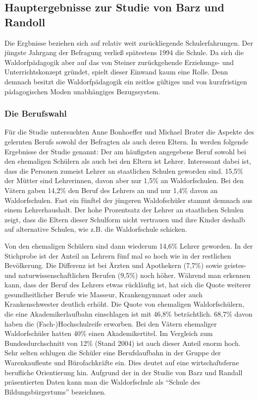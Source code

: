 \subsection{Hauptergebnisse zur Studie von Barz und Randoll} %
\label{sub:hauptergebnisse}


Die Ergbnisse beziehen sich auf relativ weit zurückliegende Schulerfahrungen. Der jüngste Jahrgang der Befragung verließ spätestens 1994 die Schule. Da sich die Waldorfpädagogik aber auf das von Steiner zurückgehende Erziehungs- und Unterrichtskonzept gründet, spielt dieser Einwand kaum eine Rolle. Denn demnach besitzt die Waldorfpädagogik ein zeitlos gültiges und von kurzfristigen pädagogischen Moden unabhängiges Bezugssystem. \citep[Vgl.][S. 16]{randoll07}

\subsubsection{Die Berufswahl}
\label{subsub:Berufswahl}

Für die Studie untersuchten Anne Bonhoeffer und Michael Brater die Aspekte des gelernten Berufs sowohl der Befragten als auch deren Eltern. In \citet[][S. 16f]{randoll07} werden folgende Ergebnisse der Studie genannt: Der am häufigsten angegebene Beruf sowohl bei den ehemaligen Schülern als auch bei den Eltern ist Lehrer. Interessant dabei ist, dass die Personen zumeist Lehrer an staatlichen Schulen geworden sind. 15,5\% der Mütter sind Lehrerinnen, davon aber nur 1,5\% an Waldorfschulen. Bei den Vätern gaben 14,2\% den Beruf des Lehrers an und nur 1,4\% davon an Waldorfschulen. Fast ein fünftel der jüngeren Waldofschüler stammt demnach aus einem Lehrerhaushalt. Der hohe Prozentsatz der Lehrer an staatlichen Schulen zeigt, dass die Eltern dieser Schulform nicht vertrauen und ihre Kinder deshalb auf alternative Schulen, wie z.B. die Waldorfschule schicken.

Von den ehemaligen Schülern sind dann wiederum 14,6\% Lehrer geworden. In der Stichprobe ist der Anteil an Lehrern fünf mal so hoch wie in der restlichen Bevölkerung. Die Differenz ist bei Ärzten und Apothekern (7,7\%) sowie geistes- und naturwissenschaftlichen Berufen (9,5\%) noch höher. Während man erkennen kann, dass der Beruf des Lehrers etwas rückläufig ist, hat sich die Quote weiterer gesundheitlicher Berufe wie Masseur, Krankengymnast oder auch Krankenschwester deutlich erhöht. Die Quote von ehemaligen Waldorfschülern, die eine Akademikerlaufbahn einschlagen ist mit 46,8\% beträchtlich. 68,7\% davon haben die (Fach-)Hochschulreife erworben. Bei den Vätern ehemaliger Waldorfschüler hatten 40\% einen Akademikertitel. Im Vergleich zum Bundesdurchschnitt von 12\% (Stand 2004) ist auch dieser Anteil enorm hoch. Sehr selten schlugen die Schüler eine Berufslaufbahn in der Gruppe der Warenkaufleute und Bürofachkräfte ein. Dies deutet auf eine wirtschaftsferne berufliche Orientierung hin. Aufgrund der in der Studie von Barz und Randall präsentierten Daten kann man die Waldorfschule als \enquote{Schule des Bildungsbürgertums} bezeichnen. \citep[][S. 17]{randoll07} 

